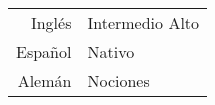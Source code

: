 \documentclass[theme]{cv_einstein}
\begin{document}
\begin{paracol}{2}
        \begin{leftcolumn*} \noindent \footnotesize
        {\color{white}
            \phantom{} \\ %
            \begin{minipage}[r]{\leftcolwidth}
                \begin{tabular}{r|l}
                    Inglés & Intermedio Alto\\[0.3em]
                    Español & Nativo\\[0.3em]
                    Alemán & Nociones
                \end{tabular}
            \end{minipage}
            \vspace{\sectionspace}
        }
        \end{leftcolumn*}
      
        
        \begin{rightcolumn}\noindent \small


\end{rightcolumn}
\end{paracol}
\end{document}
